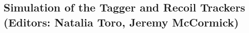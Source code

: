 
\subsection{Simulation of the Tagger and Recoil Trackers (Editors: Natalia Toro, Jeremy McCormick)}
